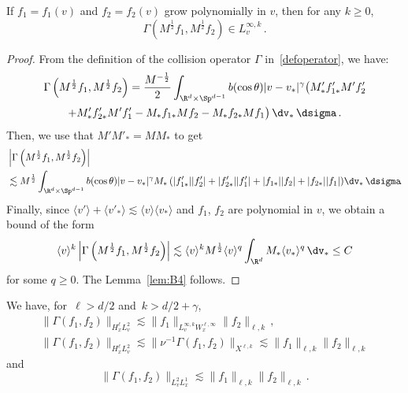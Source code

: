 \begin{lemm}\label{lem:GammaLinftyv}
If $f_1=f_1(v)$ and $f_2=f_2(v)$ grow polynomially in $v$, then for any $k \ge 0$,
\[
\Gamma(M^\frac12 f_1,M^\frac12 f_2) \in L^{\infty,k}_v \,.
\]
\end{lemm}
\begin{proof}
From the definition of the collision operator $\Gamma$ in~\eqref{defoperator}, we have:
\begin{multline*}
\Gamma\left(M^\frac12 f_1,M^\frac12 f_2\right) = \frac{M^{-\frac12}}2 \int_{\R^d \times \Sp^{d-1}} b(\cos \theta) |v-v_*|^\gamma \big(M'_*f'_{1*} M' f_2'\\
+ M'_*f'_{2*} M' f_1' - M_*f_{1*} M f_2 - M_*f_{2*} M f_1 \big) \, \dv_* \, \dsigma \,.
\end{multline*}
Then, we use that $M'M'_*=MM_*$ to get
\begin{align*}
&\left|\Gamma\left(M^\frac12 f_1,M^\frac12 f_2\right)\right| \\
&\lesssim M^\frac12 \int_{\R^d \times \Sp^{d-1}} b(\cos \theta) |v-v_*|^\gamma M_* \left(|f'_{1*}| |f_2'| + |f'_{2*}| |f_1'| + |f_{1*}| |f_2| + |f_{2*}| |f_1| \right) \! \dv_* \, \dsigma \!.
\end{align*}
Finally, since $
\langle v' \rangle + \langle v'_* \rangle \lesssim \langle v \rangle \langle v_* \rangle $ and $f_1$, $f_2$ are polynomial in $v$, we obtain a bound of the form
\[
\langle v \rangle^k \left|\Gamma\left(M^\frac12 f_1,M^\frac12 f_2\right)\right|\lesssim \langle v \rangle^kM^\frac12 \langle v \rangle^q \int_{\R^d} M_* \langle v_* \rangle^q \, \dv_* \le C
\]
for some $q \ge 0$. The Lemma~\ref{lem:B4} follows.
\end{proof}

\begin{lemm}\label{lem:B4}
We have, for~$\ell>d/2$ and~$k>d/2+\gamma$,
\begin{gather}\label{eq:GammaHellxL2v}
\|\Gamma(f_1,f_2)\|_{H^\ell_xL^2_v} \lesssim \|f_1\|_{L^{\infty,k}_v W^{\ell,\infty}_x} \|f_2\|_{\ell,k}\,,
\\ \label{estimUkai1}
\|\Gamma(f_1,f_2)\|_{H^\ell_xL^2_v} \lesssim \| \nu^{-1} \Gamma(f_1,f_2)\|_{X^{\ell,k}}\lesssim \|f_1\|_{\ell,k} \|f_2\|_{\ell,k}
\end{gather}
and
\begin{equation}\label{estimUkai2}
\|\Gamma(f_1,f_2)\|_{L^2_vL^1_x} \lesssim \|f_1\|_{\ell,k} \|f_2\|_{\ell,k} \,.
\end{equation}
\end{lemm}


